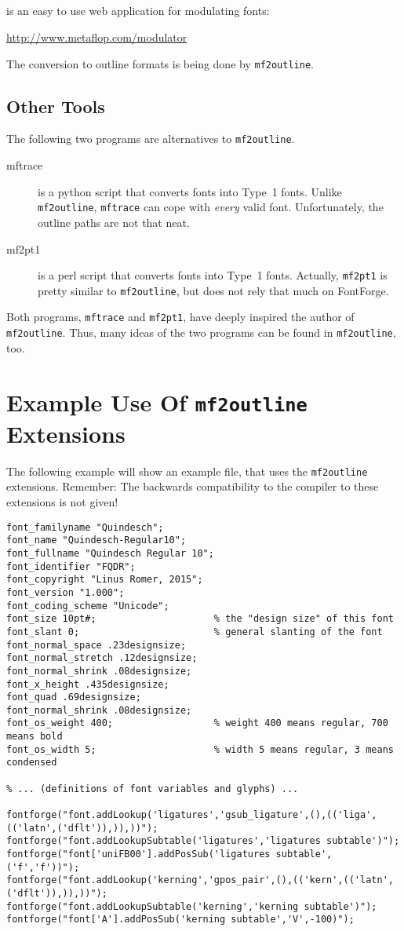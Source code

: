 \documentclass{scrartcl}
\begin{document}
\subsection{}
%
 is an easy to use web application for modulating \MF{} fonts:
\begin{center}
	\url{http://www.metaflop.com/modulator}
\end{center}
The conversion to outline formats is being done by \verb|mf2outline|. 
%
\subsection{Other Tools}
%
The following two programs are alternatives to \verb|mf2outline|.
%
\begin{description}
	\item[mftrace] is a python script that converts \MF{} fonts into Type~1 fonts. Unlike \verb|mf2outline|, \verb|mftrace| can cope with \emph{every} valid \MF{} font. Unfortunately, the outline paths are not that neat.
	\item[mf2pt1] is a perl script that converts \MF{} fonts into Type~1 fonts. Actually, \verb|mf2pt1| is pretty similar to \verb|mf2outline|, but does not rely that much on FontForge.
\end{description}
%
Both programs, \verb|mftrace| and \verb|mf2pt1|, have deeply inspired the author of \verb|mf2outline|. Thus, many ideas of the two programs can be found in \verb|mf2outline|, too.
%
\section{Example Use Of \texttt{mf2outline} Extensions}
%
The following example will show an example \MF{} file, that uses the \texttt{mf2outline} extensions. Remember: The backwards compatibility to the \MF{} compiler to these extensions is not given! 
\lstset{columns=fullflexible}
\begin{lstlisting}
font_familyname "Quindesch";
font_name "Quindesch-Regular10";
font_fullname "Quindesch Regular 10";
font_identifier "FQDR";
font_copyright "Linus Romer, 2015";
font_version "1.000";
font_coding_scheme "Unicode";
font_size 10pt#;                     % the "design size" of this font 
font_slant 0;                        % general slanting of the font   
font_normal_space .23designsize;
font_normal_stretch .12designsize;
font_normal_shrink .08designsize;
font_x_height .435designsize;
font_quad .69designsize;
font_normal_shrink .08designsize;
font_os_weight 400;                  % weight 400 means regular, 700 means bold
font_os_width 5;                     % width 5 means regular, 3 means condensed

% ... (definitions of font variables and glyphs) ...

fontforge("font.addLookup('ligatures','gsub_ligature',(),(('liga',(('latn',('dflt')),)),))");
fontforge("font.addLookupSubtable('ligatures','ligatures subtable')");
fontforge("font['uniFB00'].addPosSub('ligatures subtable',('f','f'))");
fontforge("font.addLookup('kerning','gpos_pair',(),(('kern',(('latn',('dflt')),)),))");
fontforge("font.addLookupSubtable('kerning','kerning subtable')");
fontforge("font['A'].addPosSub('kerning subtable','V',-100)");
\end{lstlisting}
%
\end{document}

